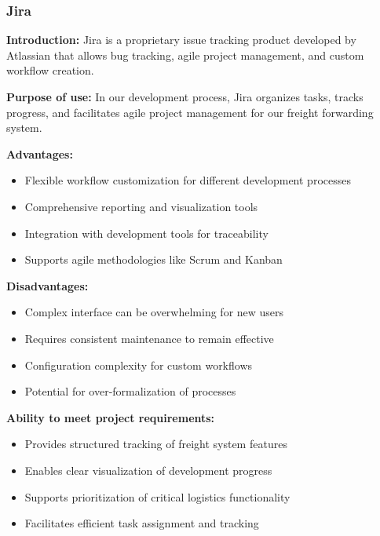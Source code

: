 \subsubsection{Jira}
\textbf{Introduction:} Jira \cite{what-is-jira} is a proprietary issue tracking product developed by Atlassian that allows bug tracking, agile project management, and custom workflow creation.

\textbf{Purpose of use:} In our development process, Jira organizes tasks, tracks progress, and facilitates agile project management for our freight forwarding system.

\textbf{Advantages:}
\begin{itemize}
    \item Flexible workflow customization for different development processes
    \item Comprehensive reporting and visualization tools
    \item Integration with development tools for traceability
    \item Supports agile methodologies like Scrum and Kanban
\end{itemize}

\textbf{Disadvantages:}
\begin{itemize}
    \item Complex interface can be overwhelming for new users
    \item Requires consistent maintenance to remain effective
    \item Configuration complexity for custom workflows
    \item Potential for over-formalization of processes
\end{itemize}

\textbf{Ability to meet project requirements:}
\begin{itemize}
    \item Provides structured tracking of freight system features
    \item Enables clear visualization of development progress
    \item Supports prioritization of critical logistics functionality
    \item Facilitates efficient task assignment and tracking
\end{itemize}